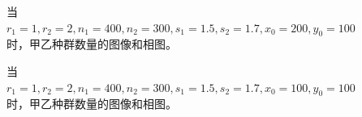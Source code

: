 \documentclass[12pt,a4paper]{article}
\begin{document}
\begin{figure}[t]
    \centering
    \caption{当$r_1=1,r_2=2,n_1=400,n_2=300,s_1=1.5,s_2=1.7,x_0=200,y_0=100$时，甲乙种群数量的图像和相图。}
    \label{fig:ex9_sub3_bigx}
\end{figure}

\begin{figure}[t]
    \centering
    \caption{当$r_1=1,r_2=2,n_1=400,n_2=300,s_1=1.5,s_2=1.7,x_0=100,y_0=100$时，甲乙种群数量的图像和相图。}
    \label{fig:ex9_sub3_unstable_bigy}
\end{figure}
\end{document}
